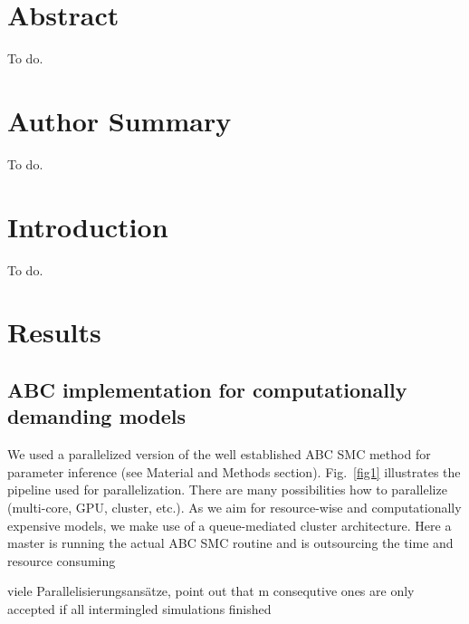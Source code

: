 \documentclass[10pt,letterpaper]{article}
\begin{document}
\tableofcontents

\section*{Abstract}
To do.


\section*{Author Summary}
To do.

\linenumbers

\section*{Introduction}
To do.


\section*{Results}

\subsection*{ABC implementation for computationally demanding models}
We used a parallelized version of the well established ABC SMC method for parameter inference (see Material and Methods section). Fig.~\ref{fig1} illustrates the pipeline used for parallelization. There are many possibilities how to parallelize (multi-core, GPU, cluster, etc.). As we aim for resource-wise and computationally expensive models, we make use of a queue-mediated cluster architecture. Here a master is running the actual ABC SMC routine and is outsourcing the time and resource consuming 

viele Parallelisierungsans\"atze, point out that m consequtive ones are only accepted if all intermingled simulations finished
\end{document}
